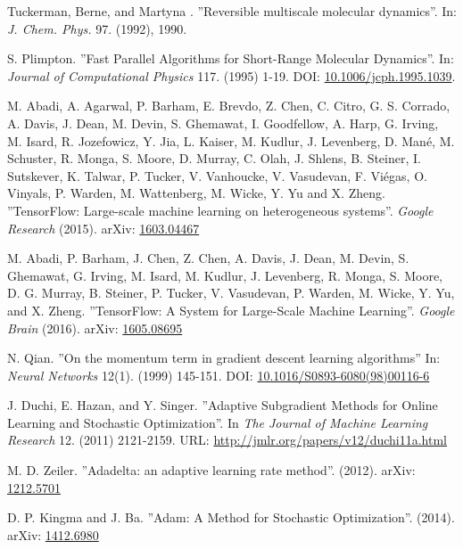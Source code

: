 \documentclass[twoside,english]{uiofysmaster}
\begin{document}
\begin{thebibliography}{56}
 Tuckerman, Berne, and Martyna .
 ''Reversible multiscale molecular dynamics''.
 In: \textit{J. Chem. Phys.} 97. (1992), 1990.
 
 S. Plimpton. 
 ''Fast Parallel Algorithms for Short-Range Molecular Dynamics''.
 In: \textit{Journal of Computational Physics} 117. (1995) 1-19. 
 DOI: \href{https://doi.org/10.1006/jcph.1995.1039}{10.1006/jcph.1995.1039}. 
 
 M. Abadi, A. Agarwal, P. Barham, E. Brevdo,
 Z. Chen, C. Citro, G. S. Corrado, A. Davis,
 J. Dean, M. Devin, S. Ghemawat, I. Goodfellow,
 A. Harp, G. Irving, M. Isard, R. Jozefowicz, Y. Jia,
 L. Kaiser, M. Kudlur, J. Levenberg, D. Mané, M. Schuster,
 R. Monga, S. Moore, D. Murray, C. Olah, J. Shlens,
 B. Steiner, I. Sutskever, K. Talwar, P. Tucker,
 V. Vanhoucke, V. Vasudevan, F. Viégas,
 O. Vinyals, P. Warden, M. Wattenberg, M. Wicke,
 Y. Yu and X. Zheng.
 ''TensorFlow: Large-scale machine learning on heterogeneous systems''.
 \textit{Google Research} (2015). 
 arXiv: \href{https://arxiv.org/abs/1603.04467}{1603.04467}
 
 M. Abadi, P. Barham, J. Chen, Z. Chen, A. Davis, J. Dean,
 M. Devin, S. Ghemawat, G. Irving, M. Isard, M. Kudlur,
 J. Levenberg, R. Monga, S. Moore, D. G. Murray, B. Steiner, P. Tucker,
 V. Vasudevan, P. Warden, M. Wicke, Y. Yu, and X. Zheng.
 ''TensorFlow: A System for Large-Scale Machine Learning''.
 \textit{Google Brain} (2016).
 arXiv: \href{https://arxiv.org/abs/1605.08695}{1605.08695}
 
 N. Qian.
 ''On the momentum term in gradient descent learning algorithms''
 In: \textit{Neural Networks} 12(1). (1999) 145-151. 
 DOI: \href{https://doi.org/10.1016/S0893-6080(98)00116-6}{10.1016/S0893-6080(98)00116-6}
 
 J. Duchi, E. Hazan, and Y. Singer.
 ''Adaptive Subgradient Methods for Online Learning and Stochastic Optimization''.
 In \textit{The Journal of Machine Learning Research} 12. (2011) 2121-2159. 
 URL: \href{http://jmlr.org/papers/v12/duchi11a.html}{http://jmlr.org/papers/v12/duchi11a.html}
 
 M. D. Zeiler. 
 ''Adadelta: an adaptive learning rate method''. (2012).
 arXiv: \href{https://arxiv.org/abs/1212.5701}{1212.5701}
 
 D. P. Kingma and J. Ba.
 ''Adam: A Method for Stochastic Optimization''. (2014).
 arXiv: \href{https://arxiv.org/abs/1412.6980}{1412.6980}
 

\end{thebibliography}
\end{document}
